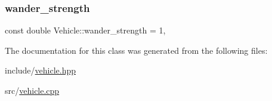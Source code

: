 \mbox{\label{classVehicle_aa9821d59ca26c38cf6189695d92320a4_aa9821d59ca26c38cf6189695d92320a4}} 
\subsubsection{\texorpdfstring{wander\+\_\+strength}{wander\_strength}}
{\footnotesize\ttfamily const double Vehicle\+::wander\+\_\+strength = 1\hspace{0.3cm}{\ttfamily [static]}, {\ttfamily [private]}}



The documentation for this class was generated from the following files\+:\begin{DoxyCompactItemize}
\item 
include/\hyperlink{vehicle_8hpp}{vehicle.\+hpp}\item 
src/\hyperlink{vehicle_8cpp}{vehicle.\+cpp}\end{DoxyCompactItemize}
